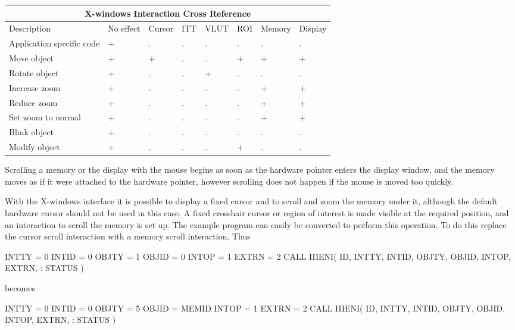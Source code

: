\documentclass[11pt,nolof]{starlink}
\begin{document}
\begin{small}
\begin{center}
\begin{tabular}{|p{11em}||p{3.0em}||p{3.5em}||p{2.5em}|
                |p{3.5em}||p{3.5em}||p{3.7em}||p{3.5em}|}
\hline
\multicolumn{8}{|c|}{X-windows Interaction Cross Reference} \\ \hline \hline
Description & No effect & Cursor & ITT & VLUT & ROI & Memory & Display \\
\hline
Application specific code & + & . & . & . & . & . & . \\
Move object               & + & + & . & . & + & + & + \\
Rotate object             & + & . & . & + & . & . & . \\
Increase zoom             & + & . & . & . & . & + & + \\
Reduce zoom               & + & . & . & . & . & + & + \\
Set zoom to normal        & + & . & . & . & . & + & + \\
Blink object              & + & . & . & . & . & . & . \\
Modify object             & + & . & . & . & + & . & . \\
\hline
\end{tabular}
\end{center}
\end{small}

Scrolling a memory or the display with the mouse begins as soon as the
hardware pointer enters the display window, and the memory moves as
if it were attached to the hardware pointer, however scrolling does
not happen if the mouse is moved too quickly.

With the X-windows interface it is possible to display a fixed cursor
and to scroll and zoom the memory under it, although the default hardware
cursor should not be used in this case. A fixed crosshair cursor or region
of interest is made visible at the required position, and an interaction
to scroll the memory is set up. The example program can easily be converted
to perform this operation. To do this replace the cursor scroll interaction
with a memory scroll interaction. Thus
\begin{small}
\begin{terminalv}
      INTTY = 0
      INTID = 0
      OBJTY = 1
      OBJID = 0
      INTOP = 1
      EXTRN = 2
      CALL IIIENI( ID, INTTY, INTID, OBJTY, OBJID, INTOP, EXTRN,
     :             STATUS )
\end{terminalv}
\end{small}
becomes
\begin{small}
\begin{terminalv}
      INTTY = 0
      INTID = 0
      OBJTY = 5
      OBJID = MEMID
      INTOP = 1
      EXTRN = 2
      CALL IIIENI( ID, INTTY, INTID, OBJTY, OBJID, INTOP, EXTRN,
     :             STATUS )
\end{terminalv}
\end{small}
\end{document}
